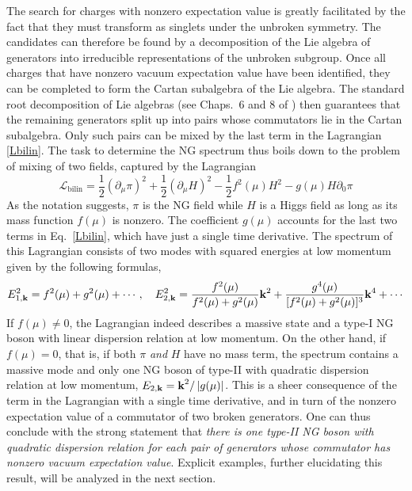 \documentclass[final,3p,times,12pt,a4paper,sort&compress]{elsarticle}
\newcommand\Lag{\mathscr{L}}                %
\newcommand\vek[1]{{\boldsymbol{\bf #1}}}   %
\newcommand\de{\partial}
\newcommand\abs[1]{\left|#1\right|}         %
\begin{document}
The search for charges with nonzero expectation value is greatly facilitated by
the fact that they must transform as singlets under the unbroken symmetry. The
candidates can therefore be found by a decomposition of the Lie algebra of
generators into irreducible representations of the unbroken subgroup.
Once all charges that have nonzero vacuum expectation value have been
identified, they can be completed to form the Cartan subalgebra of the Lie
algebra. The standard root decomposition of Lie algebras
(see Chaps.~6 and 8 of \cite{Georgi:1982jb}) then guarantees that the remaining
generators split up into pairs whose commutators lie in the Cartan subalgebra.
Only such pairs can be mixed by the last term in the Lagrangian \eqref{Lbilin}.
The task to determine the NG spectrum thus boils down to the problem of mixing
of two fields, captured by the Lagrangian
\begin{equation}
\Lag_{\text{bilin}}=\frac12(\de_\mu\pi)^2+\frac12(\de_\mu
H)^2-\frac12f^2(\mu)H^2-g(\mu)H\de_0\pi
\end{equation}
As the notation suggests, $\pi$ is the NG field while $H$ is a Higgs field as
long as its mass function $f(\mu)$ is nonzero. The coefficient $g(\mu)$ accounts
for the last two terms in Eq.~\eqref{Lbilin}, which have just a single time
derivative. The spectrum of this Lagrangian consists of two modes with squared
energies at low momentum given by the following formulas,
\begin{equation}
E_{1,\vek k}^2=f^2(\mu)+g^2(\mu)+\dotsb,\quad
E_{2,\vek k}^2=\frac{f^2(\mu)}{f^2(\mu)+g^2(\mu)}\vek k^2+
\frac{g^4(\mu)}{[f^2(\mu)+g^2(\mu)]^3}\vek k^4+\dotsb
\end{equation}
If $f(\mu)\neq0$, the Lagrangian indeed describes a massive state and a type-I
NG boson with linear dispersion relation at low momentum. On the other hand, if
$f(\mu)=0$, that is, if both $\pi$ \emph{and} $H$ have no mass term, the
spectrum contains a massive mode and only one NG boson of type-II with
quadratic dispersion relation at low momentum, $E_{2,\vek k}=\vek
k^2/\abs{g(\mu)}$. This is a sheer consequence of the term in the Lagrangian
with a single time derivative, and in turn of the nonzero expectation value of
a commutator of two broken generators. One can thus conclude with the strong
statement that \emph{there is one type-II NG boson with quadratic dispersion
relation for each pair of generators whose commutator has nonzero vacuum
expectation value}. Explicit examples, further elucidating this result,
will be analyzed in the next section.
\end{document}
